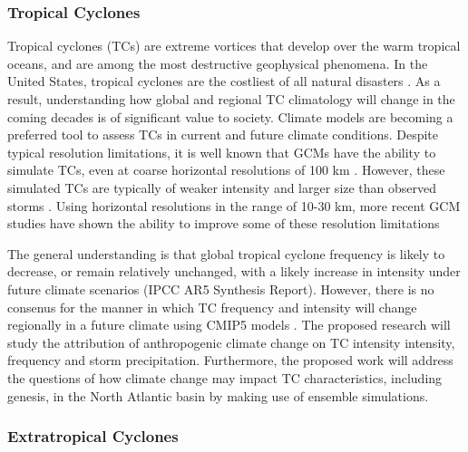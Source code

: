 \documentclass[11pt]{article}
\begin{document}
\subsubsection{Tropical Cyclones}
Tropical cyclones (TCs) are extreme vortices that develop over the warm tropical oceans, and are among the most destructive geophysical phenomena. In the United States, tropical cyclones are the costliest of all natural disasters \citep{Pielke1998}. As a result, understanding how global and regional TC climatology will change in the coming decades is of significant value to society. Climate models are becoming a preferred tool to assess TCs in current and future climate conditions. Despite typical resolution limitations, it is well known that GCMs have the ability to simulate TCs, even at coarse horizontal resolutions of 100 km \citep{Knutson2010}. However, these simulated TCs are typically of weaker intensity and larger size than observed storms \citep{Walsh2007}. Using horizontal resolutions in the range of 10-30 km, more recent GCM studies have shown the ability to improve some of these resolution limitations \citep{Murakami2012,Manganello2012, Bacmeister2014, Wehner2014}

The general understanding is that global tropical cyclone frequency is likely to decrease, or remain relatively unchanged, with a likely increase in intensity under future climate scenarios (IPCC AR5 Synthesis Report). However, there is no consenus for the manner in which TC frequency and intensity will change regionally in a future climate using CMIP5 models \citep{Camargo2013}. The proposed research will study the attribution of anthropogenic climate change on TC intensity intensity, frequency and storm precipitation. Furthermore, the proposed work will address the questions of how climate change may impact TC characteristics, including genesis, in the North Atlantic basin by making use of ensemble simulations.  

\subsubsection{Extratropical Cyclones}
\end{document}
